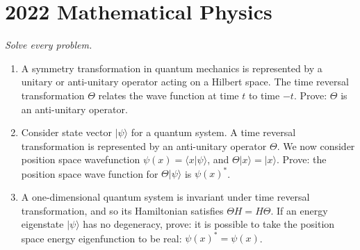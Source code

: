 \section{2022 Mathematical Physics}

\textit{Solve every problem.}

\begin{exercise}
\label{physics:2022:1}
\begin{enumerate}[label=(\alph*)]
    \item A symmetry transformation in quantum mechanics is represented by a unitary or anti-unitary operator acting on a Hilbert space. The time reversal transformation $\Theta$ relates the wave function at time $t$ to time $-t$. Prove: $\Theta$ is an anti-unitary operator.
    \item Consider state vector $|\psi\rangle$ for a quantum system. A time reversal transformation is represented by an anti-unitary operator $\Theta$. We now consider position space wavefunction $\psi(x) = \langle x | \psi\rangle$, and $\Theta |x\rangle = |x\rangle$. Prove: the position space wave function for $\Theta|\psi\rangle$ is $\psi(x)^*$.
    \item A one-dimensional quantum system is invariant under time reversal transformation, and so its Hamiltonian satisfies $\Theta H = H \Theta$. If an energy eigenstate $|\psi\rangle$ has no degeneracy, prove: it is possible to take the position space energy eigenfunction to be real: $\psi(x)^* = \psi(x)$.
\end{enumerate}
\end{exercise}

